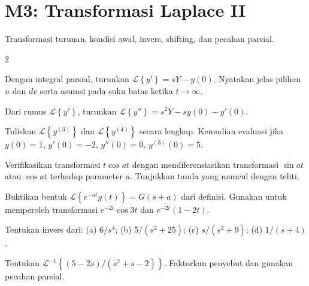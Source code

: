 \documentclass[10pt,a4paper]{article}
\newcommand{\level}[1]{\colorbox{levelbg}{\scriptsize\strut #1}}
\newcommand{\src}[1]{\colorbox{sourcebg}{\scriptsize\strut #1}}
\newcommand{\Lap}[1]{\mathcal{L}\left\{#1\right\}}
\newcommand{\iLap}[1]{\mathcal{L}^{-1}\left\{#1\right\}}
\begin{document}
\section*{M3: Transformasi Laplace II}
{\color{iteraGray}\small Transformasi turunan, kondisi awal, invers, shifting, dan pecahan parsial.}\par\vspace{1mm}
\begin{multicols}{2}
\begin{qbox}[title={M3.1: Transformasi turunan pertama\hfill \level{L2}\;\src{Boas}}]
\small Dengan integral parsial, turunkan $\Lap{y'}=sY-y(0)$. Nyatakan jelas pilihan $u$ dan $dv$ serta asumsi pada suku batas ketika $t\to\infty$.
\end{qbox}
\begin{qbox}[title={M3.2: Transformasi turunan kedua\hfill \level{L2}\;\src{Boas}}]
\small Dari rumus $\Lap{y'}$, turunkan $\Lap{y''}=s^2Y-sy(0)-y'(0)$.
\end{qbox}
\begin{qbox}[title={M3.3: Orde tiga dan empat\hfill \level{L2}\;\src{Var}}]
\small Tuliskan $\Lap{y^{(3)}}$ dan $\Lap{y^{(4)}}$ secara lengkap. Kemudian evaluasi jika $y(0)=1$, $y'(0)=-2$, $y''(0)=0$, $y^{(3)}(0)=5$.
\end{qbox}
\begin{qbox}[title={M3.4: Verifikasi entri tabel dengan diferensiasi parameter\hfill \level{L3}\;\src{PR}}]
\small Verifikasikan transformasi $t\cos at$ dengan mendiferensiasikan transformasi $\sin at$ atau $\cos at$ terhadap parameter $a$. Tunjukkan tanda yang muncul dengan teliti.
\end{qbox}
\begin{qbox}[title={M3.5: Shifting eksponensial\hfill \level{L3}\;\src{PR}}]
\small Buktikan bentuk $\Lap{e^{-at}g(t)}=G(s+a)$ dari definisi. Gunakan untuk memperoleh transformasi $e^{-2t}\cos 3t$ dan $e^{-2t}(1-2t)$.
\end{qbox}
\begin{qbox}[title={M3.6: Invers Laplace langsung\hfill \level{L2}\;\src{Boas}}]
\small Tentukan invers dari: (a) $6/s^4$; (b) $5/(s^2+25)$; (c) $s/(s^2+9)$; (d) $1/(s+4)$.
\end{qbox}
\begin{qbox}[title={M3.7: Invers rasional linear\hfill \level{L3}\;\src{Boas}}]
\small Tentukan $\iLap{(5-2s)/(s^2+s-2)}$. Faktorkan penyebut dan gunakan pecahan parsial.
\end{qbox}
\begin{qbox}[title={M3.8: Lengkapi kuadrat\hfill \level{L3}\;\src{Boas}}]

\end{qbox}
\end{multicols}
\end{document}
